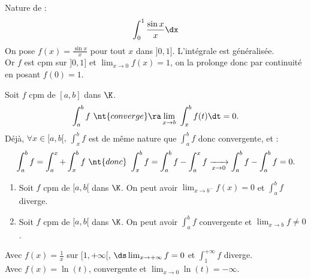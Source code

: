 \documentclass[11pt]{article}
\begin{document}
\vspace*{-0.7cm}

\begin{ex}{}{}
    Nature de :
    \begin{equation*}
        \int_0^1\frac{\sin x}{x}\dx
    \end{equation*}
    \tcblower
    On pose $f(x)=\frac{\sin x}{x}$ pour tout $x$ dans $]0,1]$. L'intégrale est généralisée.\\
    Or $f$ est cpm sur $]0,1]$ et $\lim_{x\to0} f(x)=1$, on la prolonge donc par continuité en posant $f(0)=1$.
\end{ex}

\begin{prop}{}{}
    Soit $f$ cpm de $[a,b]$ dans $\K$.
    \begin{equation*}
        \int_a^b f ~\nt{converge} \ra \lim_{x\to b} ~ \int_x^bf(t)\dt = 0.
    \end{equation*}
    \tcblower
    Déjà, $\forall x \in[a,b[, ~ \int_x^b f$ est de même nature que $\int_a^b f$ donc convergente, et :
    \begin{equation*}
        \int_a^b f = \int_a^x + \int_x^b f ~\nt{donc}~ \int_x^b f = \int_a^b f - \int_a^xf \xrightarrow[x\to 0]{} \int_a^bf - \int_a^bf = 0.
    \end{equation*} 
\end{prop}

\vspace*{-0.7cm}

\begin{prop}{}{}
    \begin{enumerate}
        \item Soit $f$ cpm de $[a,b[$ dans $\K$. On peut avoir $\lim_{x\to b^-}f(x)=0$ et $\int_a^b f$ diverge.
        \item Soit $f$ cpm de $[a,b[$ dans $\K$. On peut avoir $\int_a^bf$ convergente et $\lim_{x\to b} f \neq 0$.
    \end{enumerate}
    \tcblower
     Avec $f(x)=\frac{1}{x}$ sur $[1,+\infty[$, $\ds\lim_{x\to+\infty} f = 0$ et $\int_1^{+\infty} f$ diverge. \vspace*{-0.2cm}\\
     Avec $f(x)=\ln(t)$, convergente et $\lim_{x\to0}\ln(t)=-\infty$.
\end{prop}

\vspace*{-0.7cm}
\end{document}
